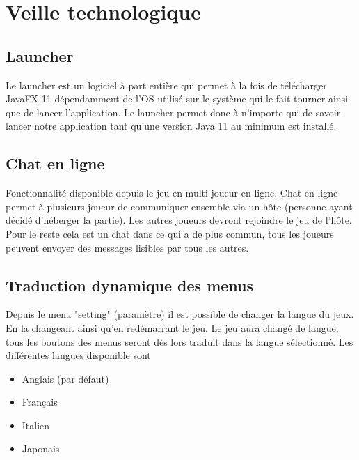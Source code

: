 \newpage
\section{Veille technologique}
\subsection{Launcher}
Le launcher est un logiciel à part entière qui permet à la fois de télécharger JavaFX 11 dépendamment de l'OS utilisé sur le système qui le fait tourner ainsi que de lancer l'application. Le launcher permet donc à n'importe qui de savoir lancer 
notre application tant qu'une version Java 11 au minimum est installé.  
\subsection{Chat en ligne}
Fonctionnalité disponible depuis le jeu en multi joueur en ligne. Chat en ligne permet à plusieurs joueur de communiquer ensemble via un hôte (personne ayant décidé d'héberger la partie). Les autres joueurs devront rejoindre le jeu de l'hôte. 
Pour le reste cela est un chat dans ce qui a de plus commun, tous les joueurs peuvent envoyer des messages lisibles par tous les autres. 
\subsection{Traduction dynamique des menus}
Depuis le menu "setting" (paramètre) il est possible de changer la langue du jeux. En la changeant ainsi qu'en redémarrant le jeu. Le jeu aura changé de langue, tous les boutons des menus seront dès lors traduit dans la langue sélectionné.
Les différentes langues disponible sont 
\begin{itemize}
	\item Anglais (par défaut)
	\item Français
	\item Italien
	\item Japonais
\end{itemize} 
